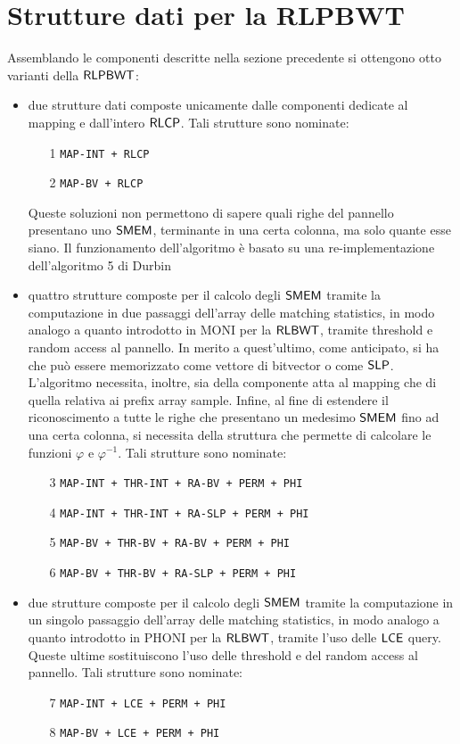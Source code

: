 \section{Strutture dati per la RLPBWT}
Assemblando le componenti descritte nella sezione precedente si ottengono otto
varianti della $\mbox{\rm {\sf RLPBWT}}$:
\begin{itemize}
  \item due strutture dati composte unicamente dalle componenti dedicate al
  mapping e dall'intero $\mbox{\rm {\sf RLCP}}$. Tali strutture sono nominate:
  \begin{enumerate}
    \item[1] \texttt{MAP-INT + RLCP}
    \item[2] \texttt{MAP-BV + RLCP}
  \end{enumerate}
  Queste soluzioni non permettono di sapere quali righe del pannello
  presentano uno $\mbox{\rm {\sf SMEM}}$, terminante in una certa colonna, ma solo quante
  esse siano. Il funzionamento dell'algoritmo è basato su una re-implementazione
  dell'algoritmo 5 di Durbin
  \item quattro strutture composte per il calcolo degli $\mbox{\rm {\sf SMEM}}$ tramite la
  computazione 
  in due passaggi dell'array delle matching statistics, in modo analogo
  a quanto introdotto in MONI \cite{moni} per la $\mbox{\rm {\sf RLBWT}}$, tramite
  threshold e random access al pannello. In merito a quest'ultimo, come
  anticipato, si ha che può essere memorizzato come vettore di
  bitvector o come 
  $\mbox{\rm {\sf SLP}}$. L'algoritmo  
  necessita, inoltre, sia della componente atta al mapping che di quella
  relativa ai prefix array sample. Infine, al fine di estendere il
  riconoscimento a tutte le righe che presentano un medesimo $\mbox{\rm {\sf SMEM}}$ fino ad una
  certa colonna, si necessita della struttura che permette di calcolare le
  funzioni $\varphi$ e $\varphi^{-1}$. Tali strutture sono nominate:
  \begin{enumerate}
    \item[3] \texttt{MAP-INT + THR-INT + RA-BV + PERM + PHI}
    \item[4] \texttt{MAP-INT + THR-INT + RA-SLP + PERM + PHI}
    \item[5] \texttt{MAP-BV + THR-BV + RA-BV + PERM + PHI}
    \item[6] \texttt{MAP-BV + THR-BV + RA-SLP + PERM + PHI}
  \end{enumerate}
  \item due strutture composte per il calcolo degli $\mbox{\rm {\sf SMEM}}$ tramite la
  computazione 
  in un singolo passaggio dell'array delle matching statistics, in modo
  analogo a quanto introdotto in PHONI \cite{phoni} per la $\mbox{\rm {\sf RLBWT}}$, tramite
  l'uso delle $\mbox{\rm {\sf LCE}}$ query. Queste ultime sostituiscono l'uso delle
  threshold e del random access al pannello. Tali strutture
  sono nominate: 
  \begin{enumerate}
    \item[7] \texttt{MAP-INT + LCE + PERM + PHI}
    \item[8] \texttt{MAP-BV + LCE + PERM + PHI}
  \end{enumerate}
\end{itemize}
